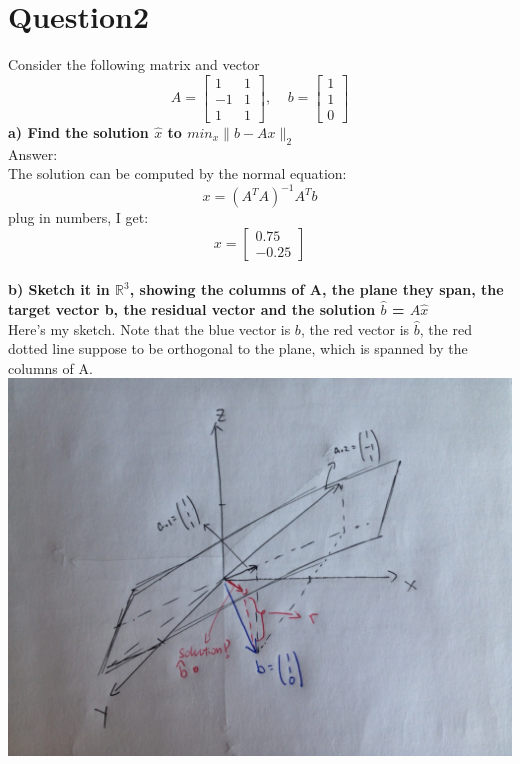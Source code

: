 \documentclass[paper=a4, fontsize=11pt]{scrartcl} %
\numberwithin{equation}{section} %
\numberwithin{figure}{section} %
\numberwithin{table}{section} %
\begin{document}
\section*{Question2}
Consider the following matrix and vector
$$
A = 
\begin{bmatrix}
1 & 1  \\
-1 & 1 \\
1 & 1 
\end{bmatrix}, 
\;\;\;\;
b = 
\begin{bmatrix}
1 \\
1 \\
0
\end{bmatrix}
$$
\textbf{a) Find the solution $\hat{x}$ to $min_x \|b - Ax\|_2$ } \\
Answer:\\
The solution can be computed by the normal equation: 
$$
x = (A^T A)^{-1} A^T b
$$
plug in numbers, I get: 
$$
x = 
\begin{bmatrix}
    0.75	\\
   -0.25
\end{bmatrix}
$$\\

\textbf{b) Sketch it in $\mathbb{R}^3$, showing the columns of A, the plane they span, the target vector b, the residual vector and the solution $\hat{b}$ = $A\hat{x}$} \\

Here's my sketch. Note that the blue vector is $b$, the red vector is $\hat{b}$, the red dotted line suppose to be orthogonal to the plane, which is spanned by the columns of A. \\
\includegraphics[scale=.32]{sketch_hw2.JPG}
\end{document}
